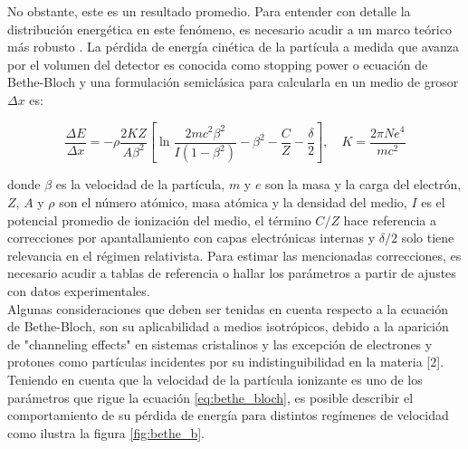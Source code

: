 \documentclass{article}
\begin{document}
\noindent No obstante, este es un resultado promedio. Para entender con detalle la distribución energética en este fenómeno, es necesario acudir a un marco teórico más robusto \cite{fano1963penetration} \cite{northcliffe1963passage}. La pérdida de energía cinética de la partícula a medida que avanza por el volumen del detector es conocida como stopping power o ecuación de Bethe-Bloch y una formulación semiclásica para calcularla en un medio de grosor $\Delta x$ es: 

\begin{equation}
    \label{eq:bethe_bloch}
    \frac{\Delta E}{\Delta x}=-\rho \frac{2 K Z}{A \beta^2}\left[\ln \frac{2 m c^2 \beta^2}{I\left(1-\beta^2\right)}-\beta^2-\frac{C}{Z}-\frac{\delta}{2}\right], \quad K = \frac{2 \pi N e^{4}}{mc^{2}}
    \end{equation}

\noindent donde $\beta$ es la velocidad de la partícula, $m$ y $e$ son la masa y la carga del electrón, $Z$, $A$ y $\rho$ son el número atómico, masa atómica y la densidad del medio, $I$ es el potencial promedio de ionización del medio, el término $C/Z$ hace referencia a correcciones por apantallamiento con capas electrónicas internas y $\delta /2$ solo tiene relevancia en el régimen relativista. Para estimar las mencionadas correcciones, es necesario acudir a tablas de referencia o hallar los parámetros a partir de ajustes con datos experimentales.\\ 

\noindent Algunas consideraciones que deben ser tenidas en cuenta respecto a la ecuación de Bethe-Bloch, son su aplicabilidad a medios isotrópicos, debido a la aparición de "channeling effects" en sistemas cristalinos y las excepción de electrones y protones como partículas incidentes por su indistinguibilidad en la materia [2].\\

\noindent Teniendo en cuenta que la velocidad de la partícula ionizante es uno de los parámetros que rigue la ecuación \ref{eq:bethe_bloch}, es posible describir el comportamiento de su pérdida de energía para distintos regímenes de velocidad como ilustra la figura \ref{fig:bethe_b}.
\end{document}
